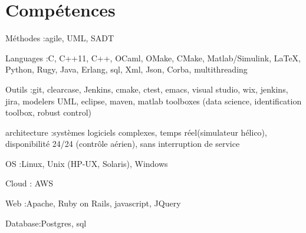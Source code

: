 \section{Compétences}

\begin{itemize}

\myitem
{Méthodes :}{agile, UML, SADT}

\myitem
{Languages :}{C, C++11, C++, OCaml, OMake, CMake, Matlab/Simulink, LaTeX, Python, Rugy, Java, Erlang, sql, Xml, Json, Corba, multithreading}

\myitem
{Outils :}{git, clearcase, Jenkins, cmake, ctest, emacs, visual studio, wix, jenkins, jira, modelers UML, eclipse, maven, matlab toolboxes (data science, identification toolbox, robust control)}

\myitem
{architecture :}{systèmes logiciels complexes, temps réel(simulateur hélico), disponibilité 24/24 (contrôle aérien), sans interruption de service}

\myitem
{OS :}{Linux, Unix (HP-UX, Solaris), Windows}

\myitem
{Cloud} : {AWS}

\myitem 
{Web :}{Apache, Ruby on Rails, javascript, JQuery}

\myitem 
{Database:}{Postgres, sql}

\end{itemize}

